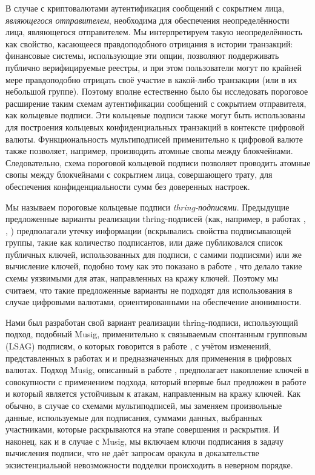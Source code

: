 \documentclass{mrl}
\theoremstyle{definition}
\numberwithin{theorem}{subsection}
\begin{document}
В случае с криптовалютами аутентификация сообщений с сокрытием лица, \textit{являющегося отправителем}, необходима для обеспечения неопределённости лица, являющегося отправителем. Мы интерпретируем такую неопределённость как свойство, касающееся правдоподобного отрицания в истории транзакций: финансовые системы, использующие эти опции, позволяют поддерживать публично верифицируемые реестры, и при этом пользователи могут по крайней мере правдоподобно отрицать своё участие в какой-либо транзакции (или в их небольшой группе). Поэтому вполне естественно было бы исследовать пороговое расширение таким схемам аутентификации сообщений с сокрытием отправителя, как кольцевые подписи. Эти кольцевые подписи также могут быть использованы для построения кольцевых конфиденциальных транзакций в контексте цифровой валюты. Функциональность мультиподписей применительно к цифровой валюте также позволяет, например, производить атомные свопы между блокчейнами. Следовательно, схема пороговой кольцевой подписи позволяет проводить атомные свопы между блокчейнами с сокрытием лица, совершающего трату, для обеспечения конфиденциальности сумм без доверенных настроек.

Мы называем пороговые кольцевые подписи \textit{thring-подписями}. Предыдущие предложенные варианты реализации thring-подписей (как, например, в работах \cite{bresson2002threshold}, \cite{liu2003separable}, \cite{tsang2004separable}) предполагали утечку информации (вскрывались свойства подписывающей группы, такие как количество подписантов, или даже публиковался список публичных ключей, использованных для подписи, с самими подписями) или же вычисление ключей, подобно тому как это показано в работе \cite{bellare2006multi}, что делало такие схемы уязвимыми для атак, направленных на кражу ключей. Поэтому мы считаем, что такие предложенные варианты не подходят для использования в случае цифровыми валютами, ориентированными на обеспечение анонимности.

Нами был разработан свой вариант реализации thring-подписи, использующий подход, подобный Musig, применительно к связываемым спонтанным групповым (LSAG) подписям, о которых говорится в работе \cite{liu2004linkable}, с учётом изменений, представленных в работах \cite{backLSAG} и \cite{noether2016ring} и предназначенных для применения в цифровых валютах. Подход Musig, описанный в работе \cite{maxwell2018simple}, предполагает накопление ключей в совокупности с применением подхода, который впервые был предложен в работе \cite{qian2010non} и который является устойчивым к атакам, направленным на кражу ключей. Как обычно, в случае со схемами мультиподписей, мы заменяем произвольные данные, используемые для подписания, суммами данных, выбранных участниками, которые раскрываются на этапе совершения и раскрытия. И наконец, как и в случае с Musig, мы включаем ключи подписания в задачу вычисления подписи, что не даёт запросам оракула в доказательстве экзистенциальной невозможности подделки происходить в неверном порядке.
\end{document}
